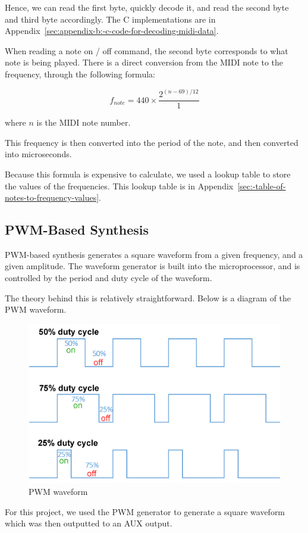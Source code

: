 Hence, we can read the first byte, quickly decode it, and read the second byte and third byte accordingly.
The C implementations are in Appendix~\ref{sec:appendix-b:-c-code-for-decoding-midi-data}.

When reading a note on / off command, the second byte corresponds to what note is being played.
There is a direct conversion from the MIDI note to the frequency, through the following formula:

\[
f_{note}=440\times\frac{2^{(n-69)/12}}{1}
\]

where $n$ is the MIDI note number.

This frequency is then converted into the period of the note, and then converted into microseconds.

Because this formula is expensive to calculate, we used a lookup table to store the values of the frequencies.
This lookup table is in Appendix~\ref{sec:-table-of-notes-to-frequency-values}.

\subsection{PWM-Based Synthesis}\label{subsec:pwm-based-synthesis-theory}

PWM-based synthesis generates a square waveform from a given frequency, and a given amplitude.
The waveform generator is built into the microprocessor, and is controlled by the period and duty cycle of the waveform.

The theory behind this is relatively straightforward.
Below is a diagram of the PWM waveform.

\begin{figure}[H]
    \centering
    \includegraphics[width = 0.5 \textwidth]{pwmwaveform}
    \caption{PWM waveform \cite{pwm}} %
    \label{fig:pwmwaveform}
\end{figure}

For this project, we used the PWM generator to generate a square waveform which was then outputted to an AUX output.

